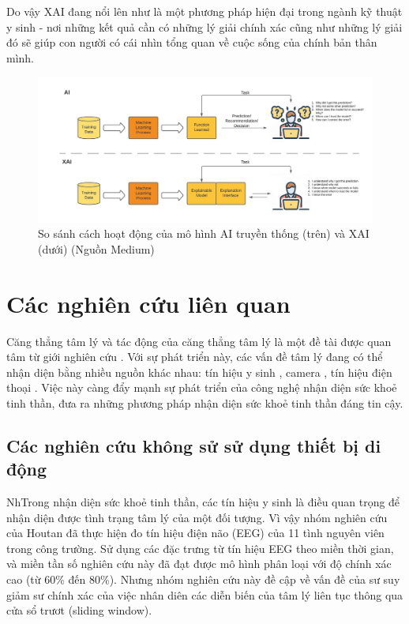 Do vậy XAI đang nổi lên như là một phương pháp hiện đại trong ngành kỹ thuật y sinh - nơi những kết quả cần có những lý giải chính xác cũng như những lý giải đó sẽ giúp con người có cái nhìn tổng quan về cuộc sống của chính bản thân mình.
\begin{figure}
    \centering
    \includegraphics[width=\linewidth]{XAI.jpeg}
    \caption[]{So sánh cách hoạt động của mô hình AI truyền thống (trên) và XAI (dưới) (Nguồn Medium\footnotemark)}
    \label{fig:enter-label}
\end{figure}
\newpage
\section{Các nghiên cứu liên quan}
Căng thẳng tâm lý và tác động của căng thẳng tâm lý là một đề tài được quan tâm từ giới nghiên cứu  \cite{stress_heartrate,Stress_thermo,stress_eeg,student_life,student_life2,student_life3,student_life4,eustress_distress,eustress_distress2,eustress_distress3,eustress_distress4}. Với sự phát triển này, các vấn đề tâm lý đang có thể nhận diện bằng nhiều nguồn khác nhau: tín hiệu y sinh \cite{stress_eeg,stress_eeg2, stress_heartrate}, camera \cite{Stress_thermo}, tín hiệu điện thoại \cite{student_life, student_life2}. Việc này càng đẩy mạnh sự phát triển của công nghệ nhận diện sức khoẻ tinh thần, đưa ra những phương pháp nhận diện sức khoẻ tinh thần đáng tin cậy.
\subsection{Các nghiên cứu không sử sử dụng thiết bị di động}
NhTrong nhận diện sức khoẻ tinh thần, các tín hiệu y sinh là điều quan trọng để nhận diện được tình trạng tâm  lý của một đối tượng. Vì vậy nhóm nghiên cứu của Houtan \cite{stress_eeg} đã thực hiện đo tín hiệu điện não (EEG) của 11 tình nguyên viên trong công trường. Sử dụng các đặc trưng từ tín hiệu EEG theo miền thời gian, và miền tần số nghiên cứu này đã đạt được mô hình phân loại với độ chính xác cao (từ 60\% đến 80\%). Nhưng nhóm nghiên cứu này đề cập về vấn đề của sư suy giảm sư chính xác của việc nhân diên các diễn biến của tâm lý liên tục thông qua cửa sổ trươt (sliding window).

